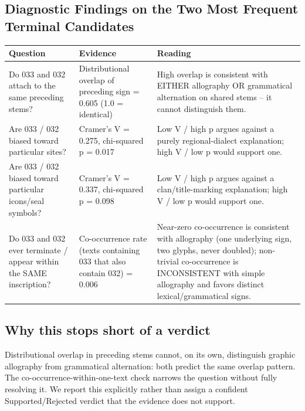 \subsection{Diagnostic Findings on the Two Most Frequent Terminal Candidates}
\begin{tabular}{p{}p{}p{}}
\toprule
\textbf{Question} & \textbf{Evidence} & \textbf{Reading} \\
\midrule
Do 033 and 032 attach to the same preceding stems? & Distributional overlap of preceding sign = 0.605 (1.0 = identical) & High overlap is consistent with EITHER allography OR grammatical alternation on shared stems -- it cannot distinguish them. \\
Are 033 / 032 biased toward particular sites? & Cramer's V = 0.275, chi-squared p = 0.017 & Low V / high p argues against a purely regional-dialect explanation; high V / low p would support one. \\
Are 033 / 032 biased toward particular icons/seal symbols? & Cramer's V = 0.337, chi-squared p = 0.098 & Low V / high p argues against a clan/title-marking explanation; high V / low p would support one. \\
Do 033 and 032 ever terminate / appear within the SAME inscription? & Co-occurrence rate (texts containing 033 that also contain 032) = 0.006 & Near-zero co-occurrence is consistent with allography (one underlying sign, two glyphs, never doubled); non-trivial co-occurrence is INCONSISTENT with simple allography and favors distinct lexical/grammatical signs. \\
\bottomrule
\end{tabular}

\subsection*{Why this stops short of a verdict}
Distributional overlap in preceding stems cannot, on its own, distinguish
graphic allography from grammatical alternation: both predict the same
overlap pattern. The co-occurrence-within-one-text check narrows the
question without fully resolving it. We report this explicitly rather than
assign a confident Supported/Rejected verdict that the evidence does not
support.
